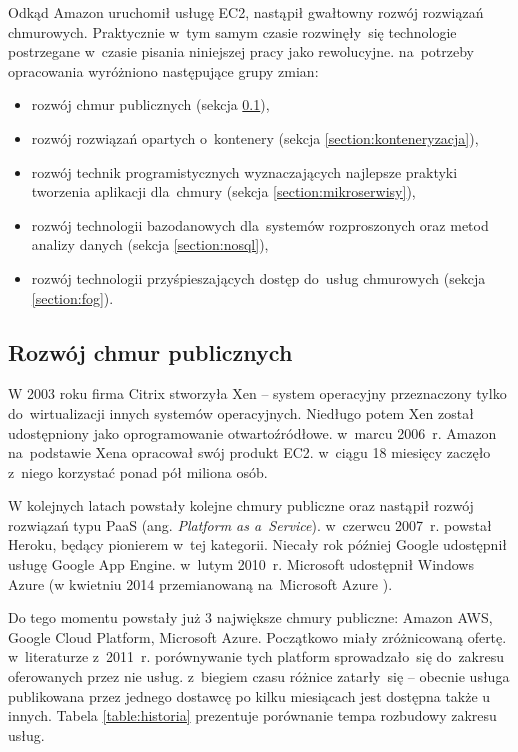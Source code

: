 \documentclass[12pt,a4paper,twoside,titlepage,openright]{book}
\begin{document}
Odkąd Amazon uruchomił usługę EC2, nastąpił gwałtowny rozwój rozwiązań chmurowych. Praktycznie w~tym samym czasie rozwinęły~się technologie postrzegane w~czasie pisania niniejszej pracy jako rewolucyjne. na~potrzeby opracowania wyróżniono następujące grupy zmian:
\begin{itemize}
\item rozwój chmur publicznych (sekcja \ref{section:chmuryPubliczne}),
\item rozwój rozwiązań opartych o~kontenery (sekcja \ref{section:konteneryzacja}),
\item rozwój technik programistycznych wyznaczających najlepsze praktyki tworzenia aplikacji dla~chmury (sekcja \ref{section:mikroserwisy}),
\item rozwój technologii bazodanowych dla~systemów rozproszonych oraz metod analizy danych (sekcja \ref{section:nosql}),
\item rozwój technologii przyśpieszających dostęp do~usług chmurowych (sekcja \ref{section:fog}).
\end{itemize}

\subsection{Rozwój chmur publicznych} \label{section:chmuryPubliczne}

W 2003 roku firma Citrix stworzyła Xen -- system operacyjny przeznaczony tylko do~wirtualizacji innych systemów operacyjnych. Niedługo potem Xen został udostępniony jako oprogramowanie otwartoźródłowe. w~marcu 2006~r. Amazon na~podstawie Xena opracował swój produkt EC2. w~ciągu 18 miesięcy zaczęło z~niego korzystać ponad pół miliona osób.\cite{ccBiznes}

W kolejnych latach powstały kolejne chmury publiczne oraz nastąpił rozwój rozwiązań typu PaaS (ang. \textit{Platform as a~Service}). w~czerwcu 2007~r. powstał Heroku, będący pionierem w~tej kategorii. Niecały rok później Google udostępnił usługę Google App Engine. w~lutym 2010~r. Microsoft udostępnił Windows Azure (w kwietniu 2014 przemianowaną na~Microsoft Azure \cite{azurePackt}).

Do tego momentu powstały już 3 największe chmury publiczne: Amazon AWS, Google Cloud Platform, Microsoft Azure. Początkowo miały zróżnicowaną ofertę. w~literaturze\cite{ccBiznes} z~2011~r. porównywanie tych platform sprowadzało~się do~zakresu oferowanych przez nie usług. z~biegiem czasu różnice zatarły~się -- obecnie usługa publikowana przez jednego dostawcę po kilku miesiącach jest dostępna także u innych. Tabela \ref{table:historia} prezentuje porównanie tempa rozbudowy zakresu usług.
\end{document}
